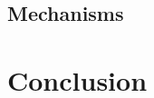 \documentclass[12pt]{article}
\begin{document}
    \subsection{Mechanisms}


    


\section{Conclusion} \label{sec:conclusion}





\clearpage

\onehalfspacing

%
\end{document}
